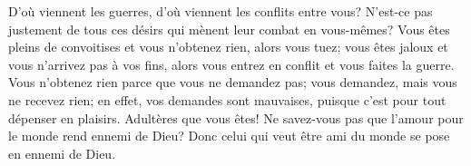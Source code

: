 D’où viennent les guerres, d’où viennent les conflits entre vous?
N’est-ce pas justement de tous ces désirs
	qui mènent leur combat en vous-mêmes?
Vous êtes pleins de convoitises et vous n’obtenez rien, alors vous tuez;
	vous êtes jaloux et vous n’arrivez pas à vos fins,
	alors vous entrez en conflit et vous faites la guerre.
Vous n’obtenez rien parce que vous ne demandez pas;
	vous demandez, mais vous ne recevez rien;
	en effet, vos demandes sont mauvaises, puisque c’est pour tout dépenser en plaisirs.
Adultères que vous êtes!
	Ne savez-vous pas que l’amour pour le monde rend ennemi de Dieu?
	Donc celui qui veut être ami du monde se pose en ennemi de Dieu.
